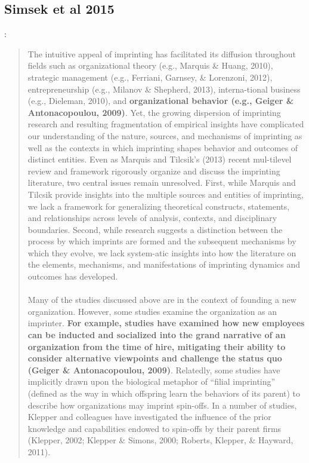 \subsection{Simsek et al 2015}

\cite{simsek2015s}:
\begin{quote}
The  intuitive  appeal  of  imprinting  has  facilitated  its  diffusion  throughout  fields  such  as  organizational theory (e.g., Marquis \& Huang, 2010), strategic management (e.g., Ferriani, Garnsey, \& Lorenzoni, 2012), entrepreneurship (e.g., Milanov \& Shepherd, 2013), interna-tional  business  (e.g.,  Dieleman,  2010),  and  {\bf organizational  behavior  (e.g.,  Geiger  \&  Antonacopoulou,  2009)}.  Yet,  the  growing  dispersion  of  imprinting  research  and  resulting  fragmentation  of  empirical  insights  have  complicated  our  understanding  of  the  nature,  sources, and mechanisms of imprinting as well as the contexts in which imprinting shapes behavior and outcomes of distinct entities. Even as Marquis and Tilcsik’s (2013) recent mul-tilevel review and framework rigorously organize and discuss the imprinting literature, two central issues remain unresolved. First, while Marquis and Tilcsik provide insights into the multiple sources and entities of imprinting, we lack a framework for generalizing theoretical constructs, statements, and relationships across levels of analysis, contexts, and disciplinary boundaries.  Second,  while  research  suggests  a  distinction  between  the  process  by  which  imprints are formed and the subsequent mechanisms by which they evolve, we lack system-atic  insights  into  how  the  literature  on  the  elements,  mechanisms,  and  manifestations  of  imprinting dynamics and outcomes has developed. \\
\\
Many of the studies discussed above are in the context of founding a new organization. However, some studies examine the organization as an imprinter. {\bf For example, studies have examined how new employees can be inducted and socialized into the grand narrative of an organization from the time of hire, mitigating their ability to consider alternative viewpoints and challenge the status quo (Geiger \& Antonacopoulou, 2009)}. Relatedly, some studies have implicitly drawn upon the biological metaphor of “filial imprinting” (defined as the way in which offspring learn the behaviors of its parent) to describe how organizations may imprint spin-offs. In a number of studies, Klepper and colleagues have investigated the influence of the  prior  knowledge  and  capabilities  endowed  to  spin-offs  by  their  parent  firms  (Klepper,  2002; Klepper \& Simons, 2000; Roberts, Klepper, \& Hayward, 2011).\\

\end{quote}
